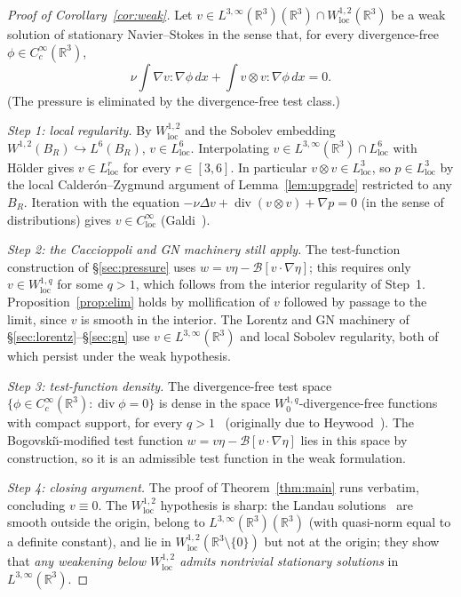 \documentclass[11pt]{amsart}
\theoremstyle{definition}
\newcommand{\RR}{\mathbb{R}}
\newcommand{\BB}{\mathcal{B}}    %
\newcommand{\Lweak}[1]{L^{3,\infty}(\RR^{#1})}
\newcommand{\loc}{\mathrm{loc}}
\DeclareMathOperator{\dv}{div}
\begin{document}
\begin{proof}[Proof of Corollary~\ref{cor:weak}]
Let $v \in \Lweak{3}(\RR^3) \cap W^{1,2}_\loc(\RR^3)$ be a weak
solution of stationary Navier--Stokes in the sense that, for every
divergence-free $\phi \in C^\infty_c(\RR^3)$,
\[
\nu \int \nabla v : \nabla \phi\, dx
+ \int v \otimes v : \nabla \phi\, dx = 0.
\]
(The pressure is eliminated by the divergence-free test class.)

\emph{Step 1: local regularity.} By $W^{1,2}_\loc$ and the
Sobolev embedding $W^{1,2}(B_R) \hookrightarrow L^6(B_R)$,
$v \in L^6_\loc$. Interpolating
$v \in \Lweak{3} \cap L^6_\loc$ with H\"older gives
$v \in L^r_\loc$ for every $r \in [3, 6]$. In particular
$v \otimes v \in L^3_\loc$, so $p \in L^3_\loc$ by the local
Calder\'on--Zygmund argument of Lemma~\ref{lem:upgrade} restricted
to any $B_R$. Iteration with the equation $-\nu\Delta v + \dv(v
\otimes v) + \nabla p = 0$ (in the sense of distributions) gives
$v \in C^\infty_\loc$ (Galdi~\cite[Ch.~V]{Galdi}).

\emph{Step 2: the Caccioppoli and GN machinery still apply.} The
test-function construction of \S\ref{sec:pressure} uses
$w = v\eta - \BB[v\cdot\nabla\eta]$; this requires only $v \in
W^{1,q}_\loc$ for some $q > 1$, which follows from the interior
regularity of Step~1. Proposition~\ref{prop:elim} holds by
mollification of $v$ followed by passage to the limit, since
$v$ is smooth in the interior. The Lorentz and GN machinery of
\S\ref{sec:lorentz}--\S\ref{sec:gn} use $v \in \Lweak{3}$ and
local Sobolev regularity, both of which persist under the weak
hypothesis.

\emph{Step 3: test-function density.} The divergence-free test
space $\{\phi \in C^\infty_c(\RR^3) : \dv \phi = 0\}$ is dense
in the space $W^{1,q}_0$-divergence-free functions with compact
support, for every $q > 1$~\cite[Thm~III.4.1]{Galdi} (originally
due to Heywood~\cite{Heywood}). The Bogovski\u{\i}-modified test
function $w = v\eta - \BB[v\cdot\nabla\eta]$ lies in this space
by construction, so it is an admissible test function in the
weak formulation.

\emph{Step 4: closing argument.} The proof of
Theorem~\ref{thm:main} runs verbatim, concluding $v \equiv 0$.
The $W^{1,2}_\loc$ hypothesis is sharp: the Landau
solutions~\cite{Landau} are smooth outside the origin, belong to
$\Lweak{3}(\RR^3)$ (with quasi-norm equal to a definite constant),
and lie in $W^{1,2}_\loc(\RR^3 \setminus \{0\})$ but not at the
origin; they show that \emph{any weakening below $W^{1,2}_\loc$
admits nontrivial stationary solutions} in $\Lweak{3}$.
\end{proof}
\end{document}
